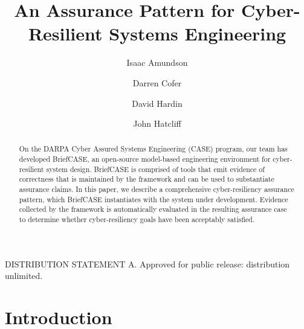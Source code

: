 \documentclass[runningheads]{llncs}
\begin{document}
\title{An Assurance Pattern for Cyber-Resilient Systems Engineering}

\author{
	Isaac Amundson 
	\and Darren Cofer 
	\and David Hardin 
	\and John Hatcliff}



\maketitle

\begin{abstract}

On the DARPA Cyber Assured Systems Engineering (CASE) program, our team has developed BriefCASE, an open-source model-based engineering environment for cyber-resilient system design.  BriefCASE is comprised of tools that emit evidence of correctness that is maintained by the framework and can be used to substantiate assurance claims.  
In this paper, we describe a comprehensive cyber-resiliency assurance pattern, which BriefCASE instantiates with the system under development. Evidence collected by the framework is automatically evaluated in the resulting assurance case to determine whether cyber-resiliency goals have been acceptably satisfied.

\end{abstract}

DISTRIBUTION STATEMENT A. Approved for public release: distribution unlimited.

\section{Introduction}
\label{sec:introduction}





%
\end{document}
